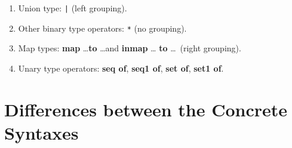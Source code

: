 \documentclass{overturerepchap}
\newcommand{\nonstandard}[1]{}
\newcommand{\keyw}[1]{{\bf\ttfamily #1}}
\begin{document}
{\begin{enumerate}
\item Union type: {\tt |} (left grouping).

\item Other binary type operators: \verb+*+ (no grouping).

\item Map types: \keyw{map} \ldots \keyw{to} \ldots and \keyw{inmap} \ldots
  \keyw{to} \ldots\ (right grouping).\nonstandard{0}

\item Unary type operators: \keyw{seq of}, \keyw{seq1 of}, \keyw{set of}, \keyw{set1 of}.
\end{enumerate}

\chapter{Differences between the Concrete Syntaxes}\label{sec:diff}

}
\end{document}
